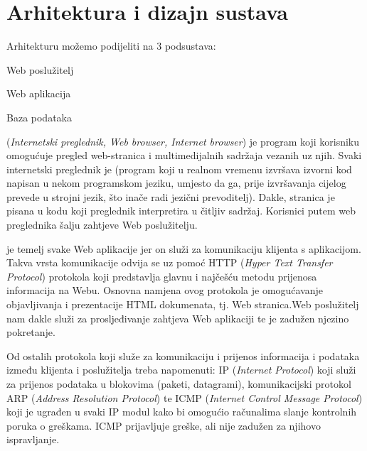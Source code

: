\chapter{Arhitektura i dizajn sustava}
		
		{Arhitekturu možemo podijeliti na 3 podsustava:}

		\begin{packed_item}
			\item {Web poslužitelj}
			\item {Web aplikacija}
			\item {Baza podataka}\vspace{0.1cm}
		\end{packed_item}
	
		{ (\textit{Internetski preglednik, Web browser, Internet browser})  je program koji korisniku omogućuje pregled web-stranica i multimedijalnih sadržaja vezanih uz njih. Svaki internetski preglednik je  (program koji u realnom vremenu izvršava izvorni kod napisan u nekom programskom jeziku, umjesto da ga, prije izvršavanja cijelog prevede u strojni jezik, što inače radi jezični prevoditelj). Dakle, stranica je pisana u kodu koji preglednik interpretira u čitljiv sadržaj. Korisnici putem web preglednika šalju zahtjeve Web poslužitelju.}\vspace{0.3cm}

		{ je temelj svake Web aplikacije jer on služi za komunikaciju klijenta s aplikacijom. Takva vrsta komunikacije odvija se uz pomoć HTTP (\textit{Hyper Text Transfer Protocol}) protokola koji predstavlja glavnu i najčešću metodu prijenosa informacija na Webu. Osnovna namjena ovog protokola je omogućavanje objavljivanja i prezentacije HTML dokumenata, tj. Web stranica.Web poslužitelj nam dakle služi za prosljeđivanje zahtjeva Web aplikaciji te je zadužen njezino pokretanje.}\vspace{0.3cm}

		{Od ostalih protokola koji služe za komunikaciju i prijenos informacija i podataka između klijenta i poslužitelja treba napomenuti: IP (\textit{Internet Protocol}) koji služi za prijenos podataka u blokovima (paketi, datagrami), komunikacijski protokol ARP (\textit{Address Resolution Protocol}) te ICMP (\textit{Internet Control Message Protocol}) koji je ugrađen u svaki IP modul kako bi omogućio računalima slanje kontrolnih poruka o greškama. ICMP prijavljuje greške, ali nije zadužen za njihovo ispravljanje.}\vspace{0.3cm}

